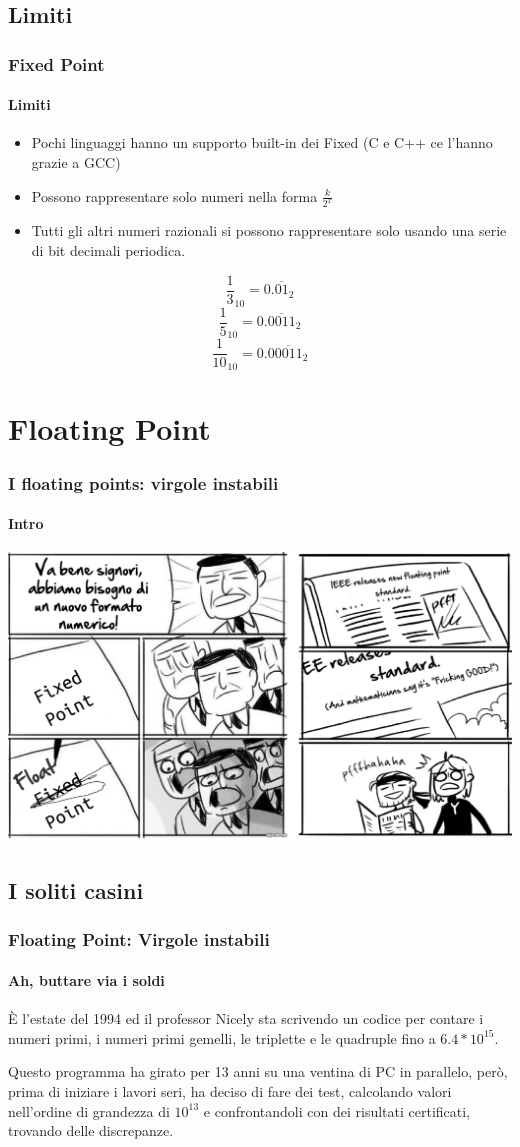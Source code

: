 \documentclass{beamer}
\begin{document}
  \subsection{Limiti}
	\begin{frame}
    \frametitle{Fixed Point}
    \framesubtitle{Limiti}
    \begin{itemize}
			\item Pochi linguaggi hanno un supporto built-in dei Fixed (C e C++ ce l'hanno grazie a GCC)
    		\item Possono rappresentare solo numeri nella forma $\frac{k}{2^x}$
    		\item Tutti gli altri numeri razionali si possono rappresentare
    			solo usando una serie di bit decimali periodica.
    \end{itemize}
    \vspace{1em}
    $$\frac{1}{3}_{10} = 0.\overline{01}_{2}$$
    $$\frac{1}{5}_{10} = 0.\overline{0011}_{2}$$
    $$\frac{1}{10}_{10} = 0.0\overline{0011}_{2}$$
  \end{frame}
  \section{Floating Point}
 	\begin{frame}
 		\frametitle{I floating points: virgole instabili}
    \framesubtitle{Intro}
    \begin{center}
    		\includegraphics[width=.8\textwidth]{IMGs/MGS-FP1.png}
    \end{center}
	\end{frame} 	 
  
  \subsection{I soliti casini}
	  \begin{frame}
	    \frametitle{Floating Point: Virgole instabili}
	    \framesubtitle{Ah, buttare via i soldi}
	    È l'estate del 1994 ed il professor Nicely sta scrivendo un codice per contare
	    i numeri primi, i numeri primi gemelli, le triplette e le quadruple fino a $6.4*10^{15}$.
	    
			\vspace{2em}	    
	    
	    Questo programma ha girato per 13 anni su una ventina di PC in parallelo, però, prima
	    di iniziare i lavori seri, ha deciso di fare dei test, calcolando valori nell'ordine
	    di grandezza di $10^{13}$ e confrontandoli con dei risultati certificati, trovando delle
	    discrepanze.
	    
	  \end{frame}
	  
\end{document}
